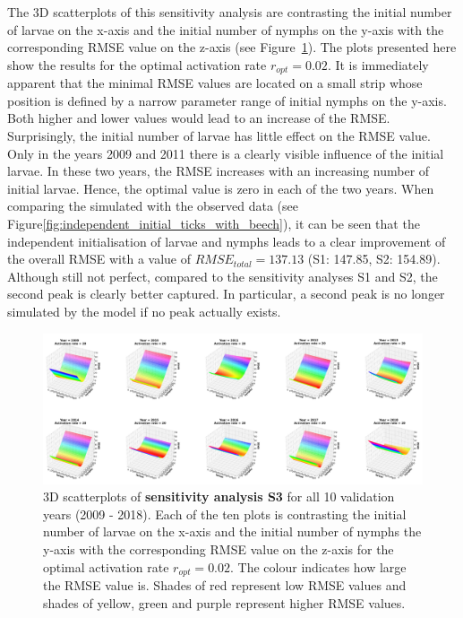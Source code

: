 \documentclass[a4paper, 11pt]{scrartcl}
\begin{document}
The 3D scatterplots of this sensitivity analysis are contrasting the initial number of larvae on the x-axis and the initial number of nymphs on the y-axis with the corresponding
RMSE value on the z-axis (see Figure~\ref{fig:independent_initial_ticks_with_beech_error}). The plots presented here show the results for the optimal activation rate
$r_{opt}= 0.02$. It is immediately apparent that the minimal RMSE values are located on a small strip whose position is defined by a narrow parameter range of initial nymphs on the
y-axis. Both higher and lower values would lead to an increase of the RMSE. Surprisingly, the initial number of larvae has little effect on the RMSE value. Only in the years
2009 and 2011 there is a clearly visible influence of the initial larvae. In these two years, the RMSE increases with an increasing number of initial larvae. Hence, the optimal
value is zero in each of the two years.
When comparing the simulated with the observed data (see Figure\ref{fig:independent_initial_ticks_with_beech}), it can be seen that the independent initialisation of larvae and
nymphs leads to a clear improvement of the overall RMSE with a value of $RMSE_{total} = 137.13$ (S1: 147.85, S2: 154.89). Although still not perfect, compared to the sensitivity
analyses S1 and S2, the second peak is clearly better captured. In particular, a second peak is no longer simulated by the model if no peak actually exists.

\begin{figure}[h!]
\centering
\includegraphics[width=\linewidth]{figures/independent_initial_ticks_with_beech_error}
\caption{3D scatterplots of \textbf{sensitivity analysis S3} for all 10 validation years (2009 - 2018). Each of the ten plots is contrasting the initial number of larvae on the
x-axis and the initial number of nymphs the y-axis with the corresponding RMSE value on the z-axis for the optimal activation rate $r_{opt} = 0.02$. The colour indicates how large
the RMSE value is. Shades of red represent low RMSE values and shades of yellow, green and purple represent higher RMSE values.}
\label{fig:independent_initial_ticks_with_beech_error}
\end{figure}
\end{document}
